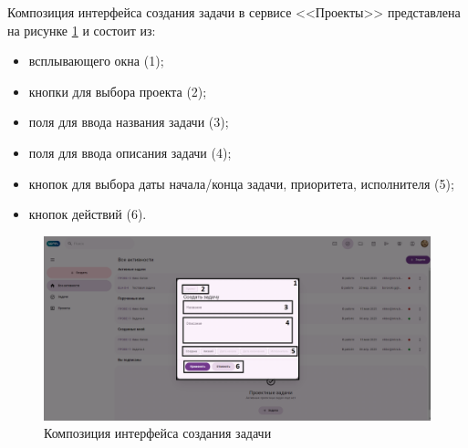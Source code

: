 Композиция интерфейса создания задачи в сервисе <<Проекты>> представлена на рисунке \ref{templ:image7c} и состоит из:
\begin{itemize}
  \item всплывающего окна (1);
  \item кнопки для выбора проекта (2);
  \item поля для ввода названия задачи (3);
  \item поля для ввода описания задачи (4);
  \item кнопок для выбора даты начала/конца задачи, приоритета, исполнителя (5);
  \item кнопок действий (6).
\end{itemize}
\begin{figure}[H]
	\centering
	\includegraphics[width=1\linewidth]{images/проекты3}
	\caption{Композиция интерфейса создания задачи}
	\label{templ:image7c}
\end{figure}

